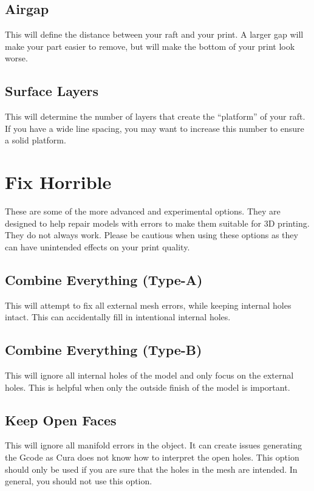 \subsection{Airgap}
This will define the distance between your raft and your print. A larger gap will make your part easier to remove, but will make the bottom of your print look worse.

\subsection{Surface Layers}
This will determine the number of layers that create the “platform” of your raft. If you have a wide line spacing, you may want to increase this number to ensure a solid platform. 

\section{Fix Horrible}
These are some of the more advanced and experimental options. They are designed to help repair models with errors to make them suitable for 3D printing. They do not always work. Please be cautious when using these options as they can have unintended effects on your print quality.

\subsection{Combine Everything (Type-A)}
This will attempt to fix all external mesh errors, while keeping internal holes intact. This can accidentally fill in intentional internal holes.

\subsection{Combine Everything (Type-B)}
This will ignore all internal holes of the model and only focus on the external holes. This is helpful when only the outside finish of the model is important.

\subsection{Keep Open Faces}
This will ignore all manifold errors in the object. It can create issues generating the Gcode as Cura does not know how to interpret the open holes. This option should only be used if you are sure that the holes in the mesh are intended. In general, you should not use this option.

